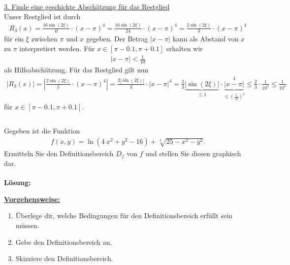 \underline{3. Finde eine geschickte Abschätzung für das Restglied}\\
Unser Restglied ist durch
\begin{align*}
R_3(x) = \frac{16  \sin(2\xi)}{4!} \cdot ( x - \pi)^4
= \frac{16  \sin(2\xi)}{24} \cdot ( x - \pi)^4
= \frac{2  \sin(2\xi)}{3} \cdot ( x - \pi)^4
\end{align*}
für ein $\xi$ zwischen $\pi$ und $x$ gegeben.
Der Betrag $| x - \pi |$ kann als Abstand von $x$ zu $\pi $ interpretiert werden.
Für $x \in [\pi - 0.1, \pi+0.1]$ erhalten wir
\begin{align*}
|x - \pi | < \frac{1}{10}
\end{align*}
als Hilfsabschätzung.
Für das Restglied gilt nun
\begin{align*}
|R_3(x)|= \left| \frac{2  \sin(2\xi)}{3} \cdot ( x - \pi)^4 \right| 
=\frac{2  | \sin(2 \xi) |}{3} \cdot |x-\pi|^4
= \frac{2}{3} \underbrace{|\sin(2 \xi)|}_{\leq 1} \cdot \underbrace{|x - \pi|}^4_{\leq \left(\frac{1}{10}\right)^4}
\leq \frac{2}{3} \cdot \frac{1}{10^4}
\leq \frac{1}{10^4}
\end{align*}
für $x \in [\pi - 0.1, \pi +0.1]$. 


\newpage

\subsection*{}
Gegeben ist die Funktion
\begin{align*}
f(x,y) = 
\ln(4 \ x^2 + y^2- 16) + \sqrt[3]{25 - x^2 - y^2}. 
\end{align*}
Ermitteln Sie den Definitionsbereich $D_f$ von $f$
und stellen Sie diesen graphisch dar.
\\
\\
\textbf{Lösung:}
\begin{mdframed}
\underline{\textbf{Vorgehensweise:}}
\begin{enumerate}
\item Überlege dir, welche Bedingungen für den Definitionsbereich erfüllt sein müssen.
\item Gebe den Definitionsbereich an. 
\item Skizziere den Definitionsbereich. 
\end{enumerate}
\end{mdframed}

